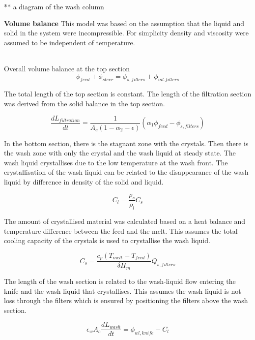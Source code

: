 ** a diagram of the wash column

\textbf{Volume balance} 
This model was based on the assumption that the liquid and solid in the system were incompressible. For simplicity density and viscosity were assumed to be independent of temperature. 

\\Overall volume balance at the top section 
\begin{equation}
\phi_{feed}+\phi_{steer}=\phi_{s,filters}+\phi_{ml.filters}
\end{equation}

The total length of the top section is constant. The length of the filtration section was derived from the solid balance in the top section. 

\begin{equation}
\frac{dL_{filtration}}{dt} = \frac{1}{A_c(1-\alpha_2-\epsilon)}(\alpha_1\phi_{feed}-\phi_{s,filters})
\end{equation}

In the bottom section, there is the stagnant zone with the crystals. Then there is the wash zone with only the crystal and the wash liquid at steady state. The wash liquid crystallises due to the low temperature at the wash front. The crystallisation of the wash liquid can be related to the disappearance of the wash liquid by difference in density of the solid and liquid.

\begin{equation}
C_l= \frac{\rho_s}{\rho_l}C_s
\end{equation}

The amount of crystallised material was calculated based on a heat balance and temperature difference between the feed and the melt. This assumes the total cooling capacity of the crystals is used to crystallise the wash liquid. 

\begin{equation}
C_s= \frac{c_p(T_{melt}-T_{feed})}{\delta H_m}Q_{s,filters}
\end{equation}

The length of the wash section is related to the wash-liquid flow entering the knife and the wash liquid that crystallises. This assumes the wash liquid is not loss through the filters which is ensured by positioning the filters above the wash section.

\begin{equation}
\epsilon_w A_c \frac{dL_{wash}}{dt}= \phi_{wl,knife}-C_l
\end{equation}

